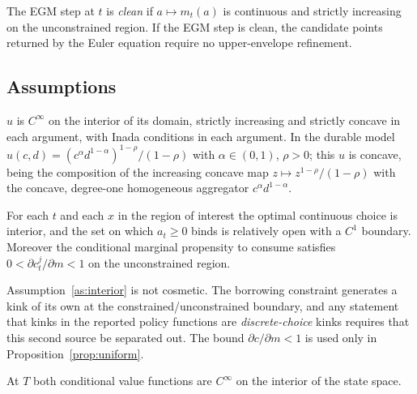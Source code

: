 \begin{definition}
\label{def:clean}
The EGM step at $t$ is \emph{clean} if $a\mapsto m_t(a)$ is continuous and strictly
increasing on the unconstrained region. If the EGM step is clean, the candidate points
returned by the Euler equation require no upper-envelope refinement.
\end{definition}

\subsection{Assumptions}
\label{subsec:smooth_assumptions}

\begin{assumption}[Felicity]
\label{as:u}
$u$ is $C^{\infty}$ on the interior of its domain, strictly increasing and strictly
concave in each argument, with Inada conditions in each argument. In the durable
model $u(c,d)=(c^{\alpha}d^{1-\alpha})^{1-\rho}/(1-\rho)$ with
$\alpha\in(0,1)$, $\rho>0$; this $u$ is concave, being the composition of the
increasing concave map $z\mapsto z^{1-\rho}/(1-\rho)$ with the concave,
degree-one homogeneous aggregator $c^{\alpha}d^{1-\alpha}$.
\end{assumption}

\begin{assumption}
\label{as:interior}
For each $t$ and each $x$ in the region of interest the optimal continuous choice is
interior, and the set on which $a_t\ge 0$ binds is relatively open with a $C^1$
boundary. Moreover the conditional marginal propensity to consume satisfies
$0<\partial c_t^{j}/\partial m<1$ on the unconstrained region.
\end{assumption}

Assumption~\ref{as:interior} is not cosmetic. The borrowing constraint generates a
kink of its own at the constrained/unconstrained boundary, and any statement that
kinks in the reported policy functions are \emph{discrete-choice} kinks requires that
this second source be separated out. The bound $\partial c/\partial m<1$ is used only
in Proposition~\ref{prop:uniform}.

\begin{assumption}
\label{as:terminal}
At $T$ both conditional value functions are $C^{\infty}$ on the interior of the state
space.
\end{assumption}

